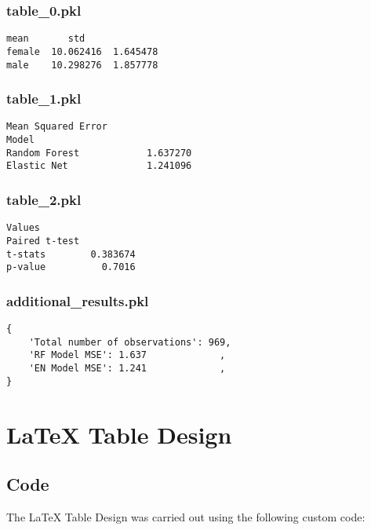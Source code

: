 \documentclass[11pt]{article}
\begin{document}
\subsubsection*{table\_0.pkl}

\begin{Verbatim}[tabsize=4]
             mean       std
female  10.062416  1.645478
male    10.298276  1.857778
\end{Verbatim}

\subsubsection*{table\_1.pkl}

\begin{Verbatim}[tabsize=4]
               Mean Squared Error
Model
Random Forest            1.637270
Elastic Net              1.241096
\end{Verbatim}

\subsubsection*{table\_2.pkl}

\begin{Verbatim}[tabsize=4]
                 Values
Paired t-test
t-stats        0.383674
p-value          0.7016
\end{Verbatim}

\subsubsection*{additional\_results.pkl}

\begin{Verbatim}[tabsize=4]
{
    'Total number of observations': 969,
    'RF Model MSE': 1.637             ,
    'EN Model MSE': 1.241             ,
}
\end{Verbatim}

\section{LaTeX Table Design}
\subsection{{Code}}
The LaTeX Table Design was carried out using the following custom code:
\end{document}
